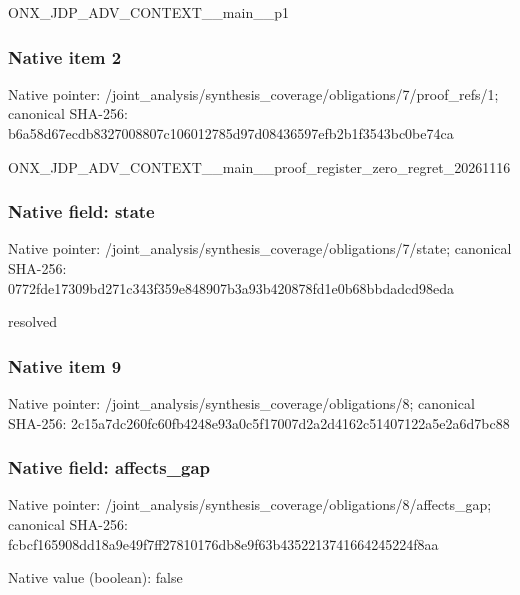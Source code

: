 \documentclass[10pt,a4paper]{article}
\begin{document}
\begingroup\raggedright\sloppy ONX\_\allowbreak{}JDP\_\allowbreak{}ADV\_\allowbreak{}CONTEXT\_\allowbreak{}\_\allowbreak{}main\_\allowbreak{}\_\allowbreak{}p1\par\endgroup

\subsubsection{Native item 2}
Native pointer: /joint\_\allowbreak{}analysis/synthesis\_\allowbreak{}coverage/obligations/7/proof\_\allowbreak{}refs/1; canonical SHA-256: b6a58d67ecdb8327008807c106012785d97d08436597efb2b1f3543bc0be74ca

\begingroup\raggedright\sloppy ONX\_\allowbreak{}JDP\_\allowbreak{}ADV\_\allowbreak{}CONTEXT\_\allowbreak{}\_\allowbreak{}main\_\allowbreak{}\_\allowbreak{}proof\_\allowbreak{}register\_\allowbreak{}zero\_\allowbreak{}regret\_\allowbreak{}20261116\par\endgroup

\subsubsection{Native field: state}
Native pointer: /joint\_\allowbreak{}analysis/synthesis\_\allowbreak{}coverage/obligations/7/state; canonical SHA-256: 0772fde17309bd271c343f359e848907b3a93b420878fd1e0b68bbdadcd98eda

\begingroup\raggedright\sloppy resolved\par\endgroup

\subsubsection{Native item 9}
Native pointer: /joint\_\allowbreak{}analysis/synthesis\_\allowbreak{}coverage/obligations/8; canonical SHA-256: 2c15a7dc260fc60fb4248e93a0c5f17007d2a2d4162c51407122a5e2a6d7bc88

\subsubsection{Native field: affects\_\allowbreak{}gap}
Native pointer: /joint\_\allowbreak{}analysis/synthesis\_\allowbreak{}coverage/obligations/8/affects\_\allowbreak{}gap; canonical SHA-256: fcbcf165908dd18a9e49f7ff27810176db8e9f63b4352213741664245224f8aa

Native value (boolean): false
\end{document}
